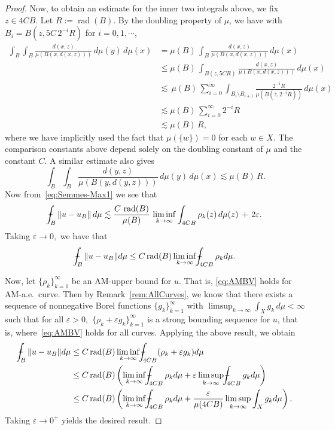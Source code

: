 \documentclass[11pt, letterpaper]{amsart} %
\newcommand*{\eps}{\varepsilon}
\providecommand*{\vint}[1]{\mathchoice
          {\mathop{\vrule width 5pt height 3 pt depth -2.5pt
                  \kern -9pt \kern 1pt\intop}\nolimits_{\kern -5pt{#1}}}
          {\mathop{\vrule width 5pt height 3 pt depth -2.6pt
                  \kern -6pt \intop}\nolimits_{\kern -3pt{#1}}}
          {\mathop{\vrule width 5pt height 3 pt depth -2.6pt
                  \kern -6pt \intop}\nolimits_{\kern -3pt{#1}}}
          {\mathop{\vrule width 5pt height 3 pt depth -2.6pt
                  \kern -6pt \intop}\nolimits_{\kern -3pt{#1}}}}
\DeclareMathOperator{\rad}{rad}
\numberwithin{equation}{section}
\theoremstyle{plain}
\theoremstyle{definition}
\begin{document}
{\begin{proof}
Now, to obtain an estimate for the inner two integrals above, we fix $z\in 4CB$.
Let $R:=\rad(B)$. By the doubling property of $\mu$, we have 
with $B_i=B(z,5C\, 2^{-i}R)$ for $i=0,1,\cdots$,
\begin{align*}
\int_B\int_B \frac{d(x,z)}{\mu(B(x,d(x,z)))}\, d\mu(y)\, d\mu(x)&=\mu(B)\, \int_B\frac{d(x,z)}{\mu(B(x,d(x,z)))}\, d\mu(x)\\
&\le \mu(B)\, \int_{B(z,5CR)} \frac{d(x,z)}{\mu(B(x,d(x,z)))}\, d\mu(x)\\
&\lesssim\, \mu(B)\, \sum_{i=0}^\infty\int_{B_i\setminus B_{i+1}} \frac{2^{-i}R}{\mu(B(z,2^{-i}R))}\, d\mu(x)\\
&\lesssim \mu(B)\, \sum_{i=0}^\infty 2^{-i}R\\
&\lesssim \mu(B)\, R,
\end{align*}
where we have implicitly used the fact that $\mu(\{w\})=0$ for each $w\in X$. The comparison constants above depend solely on
the doubling constant of $\mu$ and the constant $C$.
A similar estimate also gives
\[
\int_B\int_B \frac{d(y,z)}{\mu(B(y,d(y,z)))}\, d\mu(y)\, d\mu(x)\lesssim\mu(B)\, R.
\]
Now from~\eqref{eq:Semmes-Max1} we see that
\[
\vint{B}\Vert u-u_B\Vert\, d\mu\lesssim \frac{C\, \rad(B)}{\mu(B)}\, \liminf_{k\to\infty}\int_{4CB}\rho_k(z)\, d\mu(z)\, +\, 2\eps.
\]
Taking $\eps\to 0,$ we have that 
\[
\vint{B}\| u-u_B\|d\mu\le C\rad(B)\liminf_{k\to\infty}\vint{4CB}\rho_kd\mu.
\]

Now, let $\{\rho_k\}_{k=1}^\infty$ be an AM-upper bound for $u.$  That is, \eqref{eq:AMBV} holds for AM-a.e.\ curve.  
Then by Remark~\ref{rem:AllCurves}, we know that
there exists a sequence of nonnegative Borel functions $\{g_k\}_{k=1}^\infty$ with 
$\limsup_{k\to\infty} \int_X g_k\, d\mu<\infty$
such that for all $\eps>0,$ $\{\rho_k+\eps g_k\}_{k=1}^\infty$ is a strong bounding sequence for $u$, that is, 
where~\eqref{eq:AMBV} holds for all curves. Applying the above result, we obtain
\begin{align*}
\vint{B}\| u-u_B\|d\mu&\le C\rad(B)\liminf_{k\to\infty}\vint{4CB}(\rho_k+\eps g_k)d\mu\\
	&\le C\rad(B)\left(\liminf_{k\to\infty}\vint{4CB}\rho_kd\mu+\eps\limsup_{k\to\infty}\vint{4CB}g_kd\mu\right)\\
	&\le C\rad(B)\left(\liminf_{k\to\infty}\vint{4CB}\rho_kd\mu+\frac{\eps}{\mu(4CB)}\limsup_{k\to\infty}\int_X g_kd\mu\right).
\end{align*}
Taking $\eps\to 0^+$ yields the desired result.
\end{proof}

}
\end{document}
